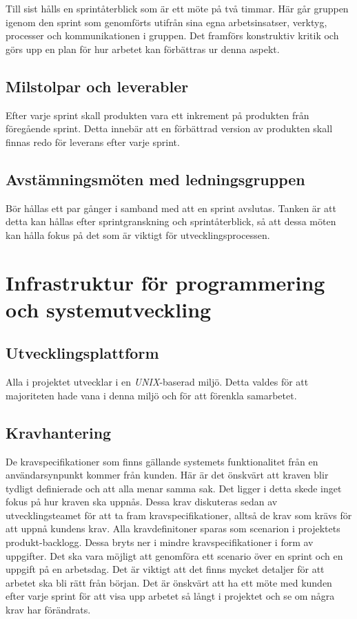 \documentclass[a4paper,12pt,oneside,final]{extbook}
\begin{document}
Till sist hålls en sprintåterblick som är ett möte på två timmar.
Här går gruppen igenom den  sprint som genomförts utifrån sina egna
arbetsinsatser, verktyg, processer och kommunikationen i gruppen.
Det framförs konstruktiv kritik och görs upp en plan för hur
arbetet kan förbättras ur denna aspekt.

\section{Milstolpar och leverabler}
Efter varje sprint skall produkten vara ett inkrement på produkten
från föregående sprint. Detta innebär att en förbättrad version av produkten
skall finnas redo för leverans efter varje sprint.

\section{Avstämningsmöten med ledningsgruppen}
Bör hållas ett par gånger i samband med att en sprint avslutas.
Tanken är att detta kan hållas efter sprintgranskning och sprintåterblick,
så att dessa möten kan hålla fokus på det som är
viktigt för utvecklingsprocessen.

\chapter{Infrastruktur för programmering och systemutveckling}

\section{Utvecklingsplattform}
Alla i projektet utvecklar i en \emph{UNIX}-baserad miljö. Detta valdes
för att majoriteten hade vana i denna miljö och för att förenkla
samarbetet.

\section{Kravhantering}
De kravspecifikationer som finns gällande systemets funktionalitet
från en användarsynpunkt kommer från kunden. Här är det önskvärt
att kraven blir tydligt definierade och att alla menar samma sak.
Det ligger i detta skede inget fokus på hur kraven ska uppnås.
Dessa krav diskuteras sedan av utvecklingsteamet för att ta fram
kravspecifikationer, alltså de krav som krävs för att uppnå kundens
krav. Alla kravdefinitoner sparas som scenarion i projektets
produkt-backlogg. Dessa bryts ner i mindre kravspecifikationer i form av
uppgifter. Det ska vara möjligt att genomföra ett scenario över en sprint
och en uppgift på en arbetsdag. Det är viktigt att det finns mycket
detaljer för att arbetet ska bli rätt från början. Det är önskvärt
att ha ett möte med kunden efter varje sprint för att visa upp
arbetet så långt i projektet och se om några krav har förändrats.
\end{document}
